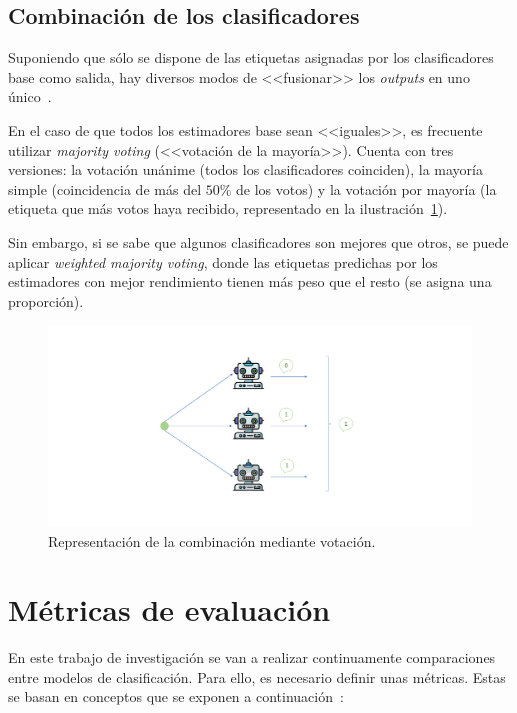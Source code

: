 \subsection{Combinación de los clasificadores}

Suponiendo que sólo se dispone de las etiquetas asignadas por los clasificadores base como salida, hay diversos modos de <<fusionar>> los \textit{outputs} en uno único~\cite{ensembles2006robi}.

En el caso de que todos los estimadores base sean <<iguales>>, es frecuente utilizar \textit{majority voting} (<<votación de la mayoría>>). Cuenta con tres versiones: la votación unánime (todos los clasificadores coinciden), la mayoría simple (coincidencia de más del $50\%$ de los votos) y la votación por mayoría (la etiqueta que más votos haya recibido, representado en la ilustración~\ref{img:voting}).

Sin embargo, si se sabe que algunos clasificadores son mejores que otros, se puede aplicar \textit{weighted majority voting}, donde las etiquetas predichas por los estimadores con mejor rendimiento tienen más peso que el resto (se asigna una proporción).

\begin{figure}[h]
	\caption[Combinación mediante votación en \textit{ensembles}]{Representación de la combinación mediante votación.}
	\label{img:voting}
	\centering
	\includegraphics[scale=0.5]{../img/memoria/3_voting.pdf}
\end{figure}



\section{Métricas de evaluación}

En este trabajo de investigación se van a realizar continuamente comparaciones entre modelos de clasificación. Para ello, es necesario definir unas métricas. Estas se basan en conceptos que se exponen a continuación~\cite{apuntesSisint}:

